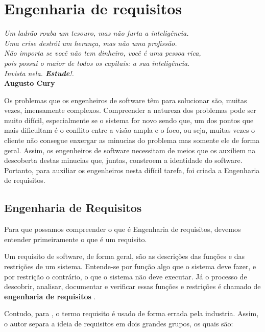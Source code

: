\setcounter{chapter}{1}
\chapter{Engenharia de requisitos}\label{cap:cap2}

\begin{flushright}
	\textit{
		Um ladrão rouba um tesouro, mas não furta a inteligência. \\
		Uma crise destrói um herança, mas não uma profissão. \\ Não importa se você não tem dinheiro, você é uma pessoa rica, \\ pois possui o maior de todos os capitais: a sua inteligência. \\ Invista nela. \textbf{Estude}!.
	} \\
	
	\textbf{Augusto Cury}
\end{flushright}

Os problemas que os engenheiros de software têm para solucionar são, muitas vezes, imensamente complexos. Compreender a natureza dos problemas pode ser muito difícil, especialmente se o sistema for novo sendo que, um dos pontos que mais dificultam é o conflito entre a visão ampla e o foco, ou seja, muitas vezes o cliente não consegue enxergar as minucias do problema mas somente ele de forma geral. Assim, os engenheiros de software necessitam de meios que os auxiliem na descoberta destas minucias que, juntas, constroem a identidade do software. Portanto, para auxiliar os engenheiros nesta difícil tarefa, foi criada a Engenharia de requisitos. 

\section{Engenharia de Requisitos}

Para que possamos compreender o que é Engenharia de requisitos, devemos entender primeiramente o que é um requisito. 

Um requisito de software, de forma geral, são as  descrições das funções e das restrições de um sistema. Entende-se por função algo que o sistema deve fazer, e por restrição o contrário, o que o sistema não deve executar. Já o processo de descobrir, analisar, documentar e verificar essas funções e restrições é chamado de \textbf{engenharia de requisitos} \cite{sommerville2003engenharia}.

Contudo, para \cite{sommerville2003engenharia}, o termo requisito é usado de forma errada pela industria. Assim, o autor separa a ideia de requisitos em dois grandes  grupos, os quais são:

